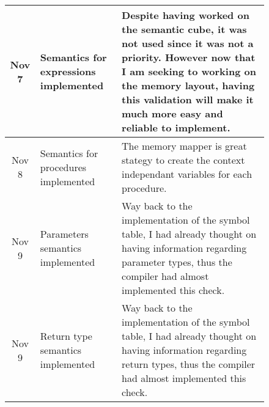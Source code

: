 \begin{figure}[h]
\begin{tabular}{cp{1.25in}p{2.5in}}
        \midrule
        Nov  7 & Semantics for \newline expressions \newline implemented &
        Despite having worked on the semantic cube, it was not used since it
        was not a priority. However now that I am seeking to working on the
        memory layout, having this validation will make it much more easy and
        reliable to implement.\\

        \midrule
        Nov  8 & Semantics for \newline procedures \newline implemented &
        The memory mapper is great stategy to create the context independant
        variables for each procedure.\\

        \midrule
        Nov  9 & Parameters \newline semantics \newline implemented &
        Way back to the implementation of the symbol table, I had already
        thought on having information regarding parameter types, thus the
        compiler had almost \newline implemented this check.\\
        
        \midrule
        Nov  9 & Return type \newline semantics \newline implemented &
        Way back to the implementation of the symbol table, I had already
        thought on having information regarding return types, thus the
        compiler had almost \newline implemented this check.\\

        \bottomrule
    \end{tabular}
\end{figure}

